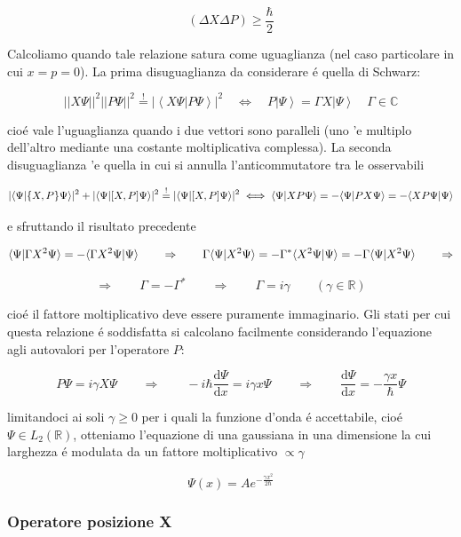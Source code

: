 $$(\Delta X\Delta P)\geq{\frac{\hbar}{2}}$$
	
Calcoliamo quando tale relazione satura come uguaglianza (nel caso particolare in cui $x = p = 0$). La prima disuguaglianza da considerare \'e quella di Schwarz:
	
$$||X\Psi||^{2}||P\Psi||^{2}\stackrel{{!}}{{=}}|\left\langle X\Psi|P\Psi\right\rangle|^{2}\quad\Longleftrightarrow\quad P\left|\Psi\right\rangle=\Gamma X\left|\Psi\right\rangle\quad\Gamma\in\mathbb{C}$$

cio\'e vale l'uguaglianza quando i due vettori sono paralleli (uno 'e multiplo dell'altro mediante una costante moltiplicativa complessa). La seconda disuguaglianza 'e quella in cui si annulla l'anticommutatore tra le osservabili
	
$$|\braket{\Psi}{\{X,P\} \Psi}|^2 + |\braket{\Psi}{[X,P] \Psi}|^2 \stackrel{{!}}{{=}} |\braket{\Psi}{[X,P] \Psi}|^2 \iff \braket{\Psi}{XP\Psi} = -\braket{\Psi}{PX\Psi} = -\braket{XP\Psi}{\Psi}$$

e sfruttando il risultato precedente

$$\braket{\Psi}{\Gamma X^2 \Psi} = - \braket{\Gamma X^2 \Psi}{\Psi} \qquad \Rightarrow \qquad \Gamma\braket{\Psi}{X^2 \Psi} = -\Gamma^* \braket{X^2 \Psi}{\Psi} = -\Gamma \braket{\Psi}{X^2 \Psi} \qquad\Rightarrow $$

$$\Rightarrow \qquad \Gamma=-\Gamma^* \qquad \Rightarrow \qquad \Gamma = i\gamma \qquad (\gamma\in \mathbb{R})$$

cio\'e il fattore moltiplicativo deve essere puramente immaginario. Gli stati per cui questa relazione \'e soddisfatta si calcolano facilmente considerando l'equazione agli autovalori per l'operatore $P$:

$$P\Psi = i\gamma X\Psi \qquad \Rightarrow \qquad -i\hbar \frac{\mathrm{d}\Psi}{\mathrm{d}x} = i\gamma x\Psi \qquad\Rightarrow\qquad \frac{\mathrm{d}\Psi}{\mathrm{d}x} = -\frac{\gamma x}{\hbar}\Psi$$
	
limitandoci ai soli $\gamma \geq 0$ per i quali la funzione d'onda \'e accettabile, cio\'e $\Psi \in L_2(\mathbb{R})$, otteniamo l'equazione di una gaussiana in una dimensione la cui larghezza \'e modulata da un fattore moltiplicativo $\propto \gamma$
	
$$\Psi(x)=A e^{-{\frac{\gamma x^{2}}{2\hbar}}}$$
	
	
\subsubsection{Operatore posizione X}
	
